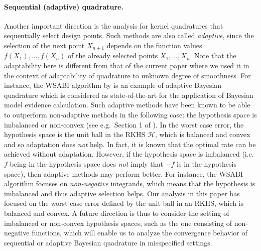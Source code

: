 \documentclass[11pt]{article}
\theoremstyle{remark}
\theoremstyle{example}
\theoremstyle{remark}
\renewcommand{\H}{{\mathcal{H}}}
\newcommand{\citealp}{\cite}
\begin{document}
\paragraph{Sequential (adaptive) quadrature.}
Another important direction is the analysis for kernel quadratures that sequentially select design points. 
Such methods are also called {\em adaptive}, since the selection of the next point $X_{n+1}$ depends on the function values $f(X_1), \dots, f(X_n)$ of the already selected points $X_1,\dots,X_n$. 
Note that the adaptability here is different from that of the current paper where we used it in the context of adaptability of quadrature to unknown degree of smoothness.
For instance, the WSABI algorithm by \cite{gunter_sampling_2014} is an example of adaptive Bayesian quadrature which is considered as 
state-of-the-art for the application of Bayesian model evidence calculation.
Such adaptive methods have been known to be able to outperform non-adaptive methods in the following case: the hypothesis space is imbalanced or non-convex (see e.g.~Section 1 of \citealp{Nov16}).
In the worst case error, the hypothesis space is the unit ball in the RKHS $\H$, which is balanced and convex and so adaptation does {\em not} help. In fact, it is known that the optimal rate can be achieved without adaptation.
However, if the hypothesis space is imbalanced (i.e. $f$ being in the hypothesis space does {\em not} imply that $-f$ is in the hypothesis space), then adaptive methods may perform better.
For instance, the WSABI algorithm focuses on {\em non-negative} integrands, which means that the hypothesis is imbalanced and thus adaptive selection helps. Our analysis in this paper has focused on the worst case error defined by the unit ball in an RKHS, which is balanced and convex.
A future direction is thus to consider the setting of imbalanced or non-convex hypothesis spaces, such as the one consisting of non-negative functions, which will enable us to analyze the convergence behavior of sequential or adaptive Bayesian quadrature in misspecified settings.\vspace{-4mm}
\end{document}
